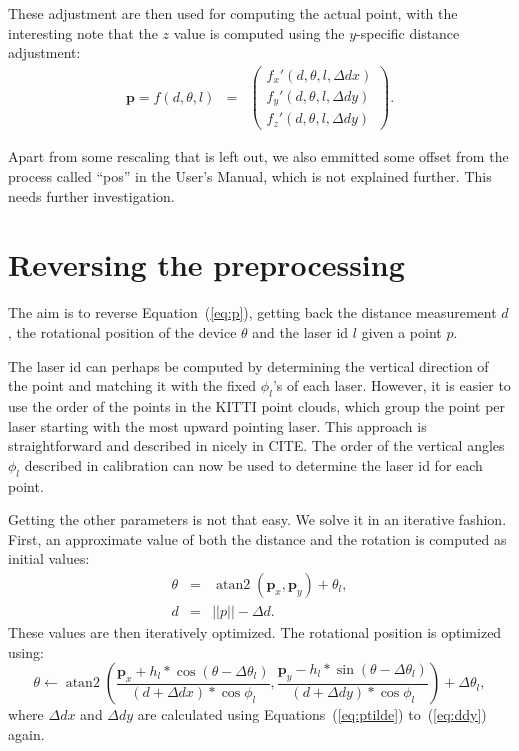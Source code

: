 \documentclass[english]{article}
\DeclareMathOperator*{\atantwo}{atan2}
\begin{document}
These adjustment are then used for computing the actual point, with the
interesting note that the $z$ value is computed using the $y$-specific
distance adjustment:
\begin{eqnarray}
  \mathbf{p} =
  f(d, \theta, l) &=& \left(
           \begin{array}{l}
              f_x'(d, \theta, l, \Delta dx) \\
              f_y'(d, \theta, l, \Delta dy) \\
              f_z'(d, \theta, l, \Delta dy)
           \end{array}
         \right).
  \label{eq:p}
\end{eqnarray}

Apart from some rescaling that is left out, we also emmitted some offset
from the process called ``pos'' in the User's Manual, which is not
explained further. This needs further investigation.


\section{Reversing the preprocessing}
The aim is to reverse Equation~(\ref{eq:p}), getting back the distance
measurement $d$, the rotational position of the device $\theta$ and the
laser id $l$ given a point $p$.

The laser id can perhaps be computed by determining the vertical
direction of the point and matching it with the fixed $\phi_l$'s of each
laser. However, it is easier to use the order of the points in the KITTI
point clouds, which group the point per laser starting with the most
upward pointing laser. This approach is straightforward and described in nicely
in CITE. The order of the vertical angles $\phi_l$ described in calibration
can now be used to determine the laser id for each point.

Getting the other parameters is not that easy. We solve it in
an iterative fashion. First, an approximate value of both the distance and
the rotation is computed as initial values:
\begin{eqnarray}
  \theta &=& \atantwo(\mathbf{p}_x, \mathbf{p}_y) + \theta_l, \\
  d &=& ||p|| - \Delta d.
\end{eqnarray}
These values are then iteratively optimized. The rotational position is optimized using:
\begin{equation}
   \theta \leftarrow \atantwo\left(
                     \frac{\mathbf{p}_x + h_l * \cos(\theta - \Delta \theta_l)}{(d + \Delta dx) * \cos{\phi_l}},
                     \frac{\mathbf{p}_y - h_l * \sin(\theta - \Delta \theta_l)}{(d + \Delta dy) * \cos{\phi_l}}
           \right) + \Delta \theta_l,
   \label{eq:thetait}
\end{equation}
where $\Delta dx$ and $\Delta dy$ are calculated using
Equations~(\ref{eq:ptilde}) to~(\ref{eq:ddy}) again.
\end{document}
